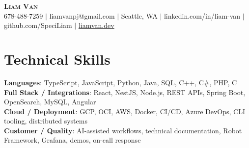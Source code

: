 \documentclass[letterpaper,11pt]{article}
\begin{document}

%
\begin{center}
    \textbf{\Huge \scshape Liam Van} \\ \vspace{1pt}
    \small 678-488-7259 $|$ \small {liamvanpj@gmail.com} $|$ Seattle, WA
 {{$|$ linkedin.com/in/liam-van} {$|$ github.com/SpeciLiam} {$|$ \href{https://liamvan.dev}{liamvan.dev}}}

\end{center}

\section{Technical Skills}
 \begin{itemize}[leftmargin=0.15in, label={}]
    \small{\item{
     \textbf{Languages}{: TypeScript, JavaScript, Python, Java, SQL, C++, C\#, PHP, C} \\
     \textbf{Full Stack / Integrations}{: React, NestJS, Node.js, REST APIs, Spring Boot, OpenSearch, MySQL, Angular} \\
     \textbf{Cloud / Deployment}{: GCP, OCI, AWS, Docker, CI/CD, Azure DevOps, CLI tooling, distributed systems} \\
     \textbf{Customer / Quality}{: AI-assisted workflows, technical documentation, Robot Framework, Grafana, demos, on-call response} \\
    }}
 \end{itemize}
%

\end{document}
